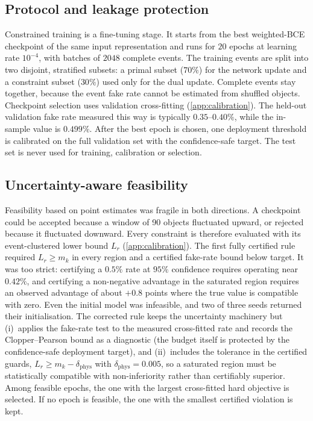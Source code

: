 \subsection{Protocol and leakage protection}
Constrained training is a fine-tuning stage. It starts from the best weighted-BCE checkpoint of the same input representation and runs for $20$ epochs at learning rate $10^{-4}$, with batches of $2048$ complete events. The training events are split into two disjoint, stratified subsets: a primal subset ($70\%$) for the network update and a constraint subset ($30\%$) used only for the dual update. Complete events stay together, because the event fake rate cannot be estimated from shuffled objects. Checkpoint selection uses validation cross-fitting (\cref{app:calibration}). The held-out validation fake rate measured this way is typically $0.35$--$0.40\%$, while the in-sample value is $0.499\%$. After the best epoch is chosen, one deployment threshold is calibrated on the full validation set with the confidence-safe target. The test set is never used for training, calibration or selection.

\subsection{Uncertainty-aware feasibility}
Feasibility based on point estimates was fragile in both directions. A checkpoint could be accepted because a window of 90 objects fluctuated upward, or rejected because it fluctuated downward. Every constraint is therefore evaluated with its event-clustered lower bound $L_r$ (\cref{app:calibration}). The first fully certified rule required $L_r\geq m_k$ in every region and a certified fake-rate bound below target. It was too strict: certifying a $0.5\%$ rate at $95\%$ confidence requires operating near $0.42\%$, and certifying a non-negative advantage in the saturated region requires an observed advantage of about $+0.8$ points where the true value is compatible with zero. Even the initial model was infeasible, and two of three seeds returned their initialisation. The corrected rule keeps the uncertainty machinery but
(i)~applies the fake-rate test to the measured cross-fitted rate and records the Clopper--Pearson bound as a diagnostic (the budget itself is protected by the confidence-safe deployment target), and
(ii)~includes the tolerance in the certified guards, $L_r\geq m_k-\delta_{\mathrm{phys}}$ with $\delta_{\mathrm{phys}}=0.005$, so a saturated region must be statistically compatible with non-inferiority rather than certifiably superior.
Among feasible epochs, the one with the largest cross-fitted hard objective is selected. If no epoch is feasible, the one with the smallest certified violation is kept.

